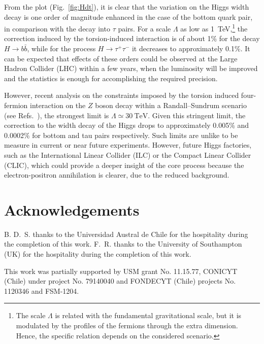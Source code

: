 \documentclass{ws-mpla}
\renewcommand{\(}{\left(}
\renewcommand{\)}{\right)}
\renewcommand{\[}{\left[}
\renewcommand{\]}{\right]}
\begin{document}
From the plot (Fig.~\ref{fig:Hdt}), it is clear that the variation on the Higgs width decay is one order of magnitude enhanced in the case of the bottom quark pair, in comparison with the decay into $\tau$ pairs. For a scale $\Lambda$ as low as \SI{1}{\TeV},\footnote{The scale $\Lambda$ is related with the fundamental gravitational scale, but it is modulated by the profiles of the fermions through the extra dimension. Hence, the specific relation depends on the considered scenario.} the correction induced by the torsion-induced interaction is of about \num{1}\% for the decay $H \to b \bar{b}$, while for the process $H \to \tau^+ \tau^-$ it decreases to approximately \num{.1}\%. It can be expected that effects of these orders could be observed at the Large Hadron Collider (LHC) within a few years, when the luminosity will be improved and the statistics is enough for accomplishing the required precision.

However, recent analysis on the constraints imposed by the torsion induced four-fermion interaction on the $Z$ boson decay within a Randall--Sundrum scenario (see Refs.~), the strongest limit is $\Lambda \simeq \SI{30}{\TeV}$. Given this stringent limit, the correction to the width decay of the Higgs drops to approximately \num{.005}\% and \num{.0002}\% for bottom and tau pairs respectively. Such limits are unlike to be measure in current or near future experiments. However, future Higgs factories, such as the International Linear Collider (ILC) or the Compact Linear Collider (CLIC), which could provide a deeper insight of the core process because the electron-positron annihilation is clearer, due to the reduced background.

\section*{Acknowledgements}

B. D.~S. thanks to the Universidad Austral de Chile for the hospitality during the completion of this work. F.~R. thanks to the University of Southampton (UK) for the hospitality during the completion of this work.

This work was partially supported by USM grant No. 11.15.77, CONICYT (Chile) under project No. 79140040 and FONDECYT (Chile) projects No. 1120346 and FSM-1204.




\end{document}
